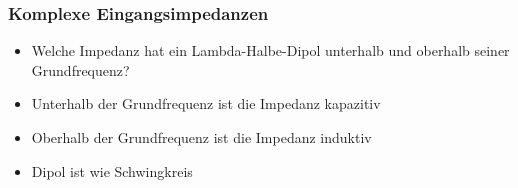 \begin{frame}
    \frametitle{Komplexe Eingangsimpedanzen}
        \begin{center}
    	\begin{itemize}
		\item Welche Impedanz hat ein Lambda-Halbe-Dipol unterhalb und oberhalb seiner Grundfrequenz? \\[1em]
        \item Unterhalb der Grundfrequenz ist die Impedanz kapazitiv \\[1em]
        \item Oberhalb der Grundfrequenz ist die Impedanz induktiv \\[1em]
       	\item Dipol ist wie Schwingkreis
    	\end{itemize}
	\end{center}
\end{frame}

